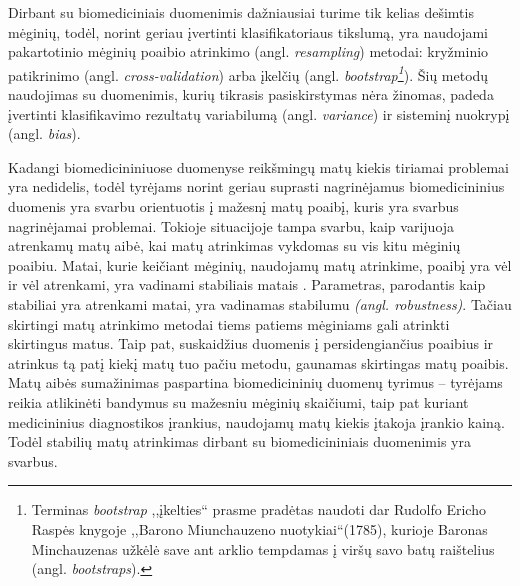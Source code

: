 Dirbant su biomediciniais duomenimis dažniausiai turime tik kelias dešimtis mėginių, todėl, norint geriau įvertinti klasifikatoriaus tikslumą, yra naudojami pakartotinio mėginių poaibio atrinkimo (angl. \textit{resampling}) metodai: kryžminio patikrinimo (angl. \textit{cross-validation}) arba įkelčių (angl. \textit{bootstrap\footnote{Terminas \textit{bootstrap} ,,įkelties`` prasme pradėtas naudoti dar Rudolfo Ericho Raspės knygoje ,,Barono Miunchauzeno nuotykiai``(1785), kurioje Baronas Minchauzenas užkėlė save ant arklio tempdamas į viršų savo batų raištelius (angl. \textit{bootstraps}).}}). Šių metodų naudojimas su duomenimis, kurių tikrasis pasiskirstymas nėra žinomas, padeda įvertinti klasifikavimo rezultatų variabilumą (angl. \textit{variance}) ir sisteminį nuokrypį (angl. \textit{bias}).




Kadangi biomedicininiuose duomenyse reikšmingų matų kiekis tiriamai problemai yra nedidelis, todėl tyrėjams norint geriau suprasti nagrinėjamus biomedicininius duomenis yra svarbu orientuotis į mažesnį matų poaibį, kuris yra svarbus nagrinėjamai problemai. Tokioje situacijoje tampa svarbu, kaip varijuoja atrenkamų matų aibė, kai matų atrinkimas vykdomas su vis kitu mėginių poaibiu. Matai, kurie keičiant mėginių, naudojamų matų atrinkime, poaibį yra vėl ir vėl atrenkami, yra vadinami stabiliais matais \cite{devijver1982pattern}. Parametras, parodantis kaip stabiliai yra atrenkami matai, yra vadinamas stabilumu \textit{(angl. robustness)}. Tačiau skirtingi matų atrinkimo metodai tiems patiems mėginiams gali atrinkti skirtingus matus. Taip pat, suskaidžius duomenis į persidengiančius poaibius ir atrinkus tą patį kiekį matų tuo pačiu metodu, gaunamas skirtingas matų poaibis. Matų aibės sumažinimas paspartina biomedicininių duomenų tyrimus -- tyrėjams reikia atlikinėti bandymus su mažesniu mėginių skaičiumi, taip 
pat kuriant medicininius diagnostikos įrankius, naudojamų matų kiekis įtakoja įrankio kainą. Todėl stabilių matų atrinkimas dirbant su biomedicininiais duomenimis yra svarbus.

